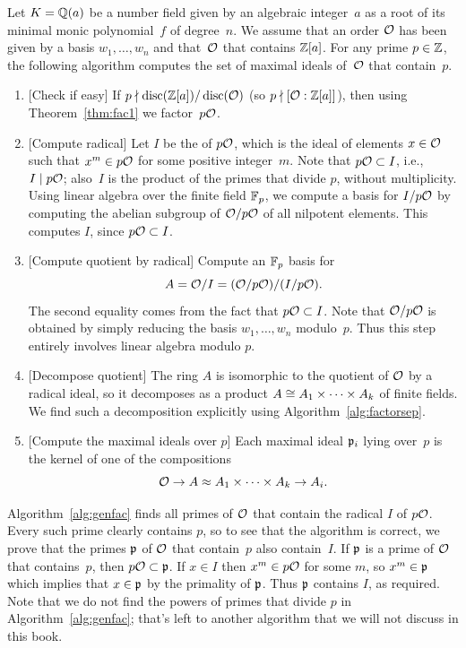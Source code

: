 \begin{algorithm}\label{alg:genfac}
Let $K=\mathbb{Q}(a)$ be a number field given
by an algebraic integer~$a$ as a root of its
minimal monic polynomial~$f$ of degree~$n$.
We assume that an order $\mathcal{O}$ has been 
given by a basis $w_1,\ldots,w_n$
and that~$\mathcal{O}$ that contains $\mathbb{Z}[a]$.
For any prime $p\in\mathbb{Z}$, the following 
algorithm computes the set of maximal ideals of~$\mathcal{O}$ that contain~$p$.
\begin{enumerate}
\item{} [Check if easy] If $p\nmid \operatorname{disc}(\mathbb{Z}[a]) / \operatorname{disc}(\mathcal{O})$ (so 
$p\nmid [\mathcal{O}:\mathbb{Z}[a]]$), then using Theorem~\ref{thm:fac1} we
factor~$p\mathcal{O}$.
\item{} [Compute radical] 
Let $I$ be the  of $p\mathcal{O}$, which is the ideal of 
elements $x\in\mathcal{O}$ such that $x^m\in p\mathcal{O}$ 
for some positive integer~$m$.  Note that $p\mathcal{O} \subset I$, i.e.,
$I\mid p\mathcal{O}$; also~$I$ is the product
of the primes that divide $p$, without multiplicity.
Using linear algebra over the finite field 
$\mathbb{F}_p$, we compute a basis for $I/p\mathcal{O}$ by computing
the abelian subgroup of $\mathcal{O}/p\mathcal{O}$ of all nilpotent
elements.  This computes $I$, since $p\mathcal{O}\subset I$.
\item{} [Compute quotient by radical] 
Compute an $\mathbb{F}_p$ basis for
$$
  A = \mathcal{O}/I = (\mathcal{O}/p\mathcal{O})/(I/p\mathcal{O}).
$$
The second equality comes from the fact that $p\mathcal{O}\subset I$.
Note that $\mathcal{O}/p\mathcal{O}$
is obtained by simply reducing the basis $w_1,\ldots, w_n$ modulo~$p$.
Thus this step entirely involves linear algebra modulo $p$.

\item{} [Decompose quotient] The ring $A$ is isomorphic to
the quotient of $\mathcal{O}$ by a radical ideal, 
so it decomposes as a product 
$A \cong A_1 \times \cdots \times A_k$ of finite fields.  
We find such a decomposition explicitly using Algorithm~\ref{alg:factorsep}.

\item{} [Compute the maximal ideals over $p$] Each maximal ideal
  $\mathfrak{p}_i$ lying over~$p$ is the kernel of one of the compositions 
$$\mathcal{O} \to A \approx A_1 \times \cdots \times A_k \to A_i.$$
\end{enumerate}
\end{algorithm}
Algorithm~\ref{alg:genfac} finds all primes of $\mathcal{O}$ that contain the radical $I$ of
$p\mathcal{O}$.  Every such prime clearly contains $p$, so to see that the
algorithm is correct, we prove that the primes $\mathfrak{p}$ of $\mathcal{O}$ that
contain~$p$ also contain~$I$.  If $\mathfrak{p}$ is a prime of $\mathcal{O}$ that
contains~$p$, then $p\mathcal{O} \subset \mathfrak{p}$.  If $x\in I$ then $x^m\in p\mathcal{O}$
for some $m$, so $x^m\in \mathfrak{p}$ which implies that $x\in \mathfrak{p}$ by the primality
of $\mathfrak{p}$.  Thus $\mathfrak{p}$ contains $I$, as required.  Note that we do not find the powers of 
primes that divide $p$ in Algorithm~\ref{alg:genfac}; that's left to another
algorithm that we will not discuss in this book.

